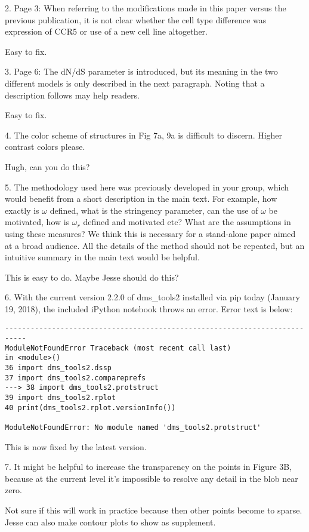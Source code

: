 \documentclass[11pt, oneside]{article}   	%
\begin{document}
2. Page 3: When referring to the modifications made in this paper versus the previous publication, it is not clear whether the cell type difference was expression of CCR5 or use of a new cell line altogether. 

{\color{red}
Easy to fix.
}

3. Page 6: The dN/dS parameter is introduced, but its meaning in the two different models is only described in the next paragraph. Noting that a description follows may help readers. 

{\color{red}
Easy to fix.}

4. The color scheme of structures in Fig 7a, 9a is difficult to discern. Higher contrast colors please. 

{\color{red}
Hugh, can you do this?}

5. The methodology used here was previously developed in your group, which would benefit from a short description in the main text. For example, how exactly is $\omega$ defined, what is the stringency parameter, can the use of $\omega$ be motivated, how is $\omega_r$ defined and motivated etc? What are the assumptions in using these measures? We think this is necessary for a stand-alone paper aimed at a broad audience. All the details of the method should not be repeated, but an intuitive summary in the main text would be helpful. 

{\color{red}
This is easy to do. Maybe Jesse should do this?}

6. With the current version 2.2.0 of dms\_tools2 installed via pip today (January 19, 2018), the included iPython notebook throws an error. Error text is below: 
\begin{verbatim}
--------------------------------------------------------------------------- 
ModuleNotFoundError Traceback (most recent call last) 
in <module>() 
36 import dms_tools2.dssp 
37 import dms_tools2.compareprefs 
---> 38 import dms_tools2.protstruct 
39 import dms_tools2.rplot 
40 print(dms_tools2.rplot.versionInfo()) 

ModuleNotFoundError: No module named 'dms_tools2.protstruct'
\end{verbatim}

{\color{red}
This is now fixed by the latest version.}

7. It might be helpful to increase the transparency on the points in Figure 3B, because at the current level it's impossible to resolve any detail in the blob near zero. 

{\color{red}
Not sure if this will work in practice because then other points become to sparse. 
Jesse can also make contour plots to show as supplement.}
\end{document}
